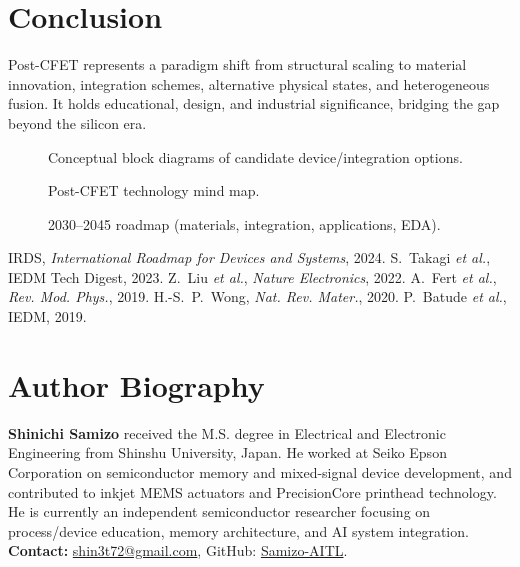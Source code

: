 \documentclass[conference]{IEEEtran}
\newcommand{\tikzcol}[2][\columnwidth]{\resizebox{#1}{!}{}}
\begin{document}
\section{Conclusion}
Post-CFET represents a paradigm shift from structural scaling to material innovation, integration schemes, alternative physical states, and heterogeneous fusion. It holds educational, design, and industrial significance, bridging the gap beyond the silicon era.

\FloatBarrier

\begin{figure*}[!t]
  \centering
  \tikzcol[.95\textwidth]{figures/block_diagram.tex}
  \caption{Conceptual block diagrams of candidate device/integration options.}
\end{figure*}

\begin{figure*}[!t]
  \centering
  \tikzcol[.95\textwidth]{figures/mindmap.tex}
  \caption{Post-CFET technology mind map.}
\end{figure*}

\begin{figure*}[!t]
  \centering
  \tikzcol[.95\textwidth]{figures/roadmap.tex}
  \caption{2030--2045 roadmap (materials, integration, applications, EDA).}
\end{figure*}

\balance
\begin{thebibliography}{00}
 IRDS, \emph{International Roadmap for Devices and Systems}, 2024.
 S.~Takagi \emph{et al.}, IEDM Tech Digest, 2023.
 Z.~Liu \emph{et al.}, \emph{Nature Electronics}, 2022.
 A.~Fert \emph{et al.}, \emph{Rev. Mod. Phys.}, 2019.
 H.-S.~P.~Wong, \emph{Nat. Rev. Mater.}, 2020.
 P.~Batude \emph{et al.}, IEDM, 2019.
\end{thebibliography}

\section*{Author Biography}
\noindent\textbf{Shinichi Samizo} received the M.S. degree in Electrical and Electronic Engineering from Shinshu University, Japan. He worked at Seiko Epson Corporation on semiconductor memory and mixed-signal device development, and contributed to inkjet MEMS actuators and PrecisionCore printhead technology. He is currently an independent semiconductor researcher focusing on process/device education, memory architecture, and AI system integration.\\
\textbf{Contact:} \href{mailto:shin3t72@gmail.com}{shin3t72@gmail.com}, GitHub: \href{https://github.com/Samizo-AITL}{Samizo-AITL}.
\end{document}
